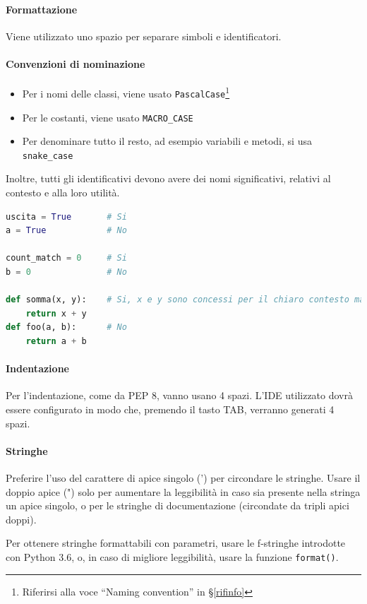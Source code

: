 		\paragraph{Formattazione}
		Viene utilizzato uno spazio per separare simboli e identificatori.
		


		\paragraph{Convenzioni di nominazione}
		\begin{itemize}
			\item Per i nomi delle classi, viene usato \texttt{PascalCase}\footnote{Riferirsi alla voce ``Naming convention'' in \S\ref{rifinfo}}
			\item Per le costanti, viene usato \texttt{MACRO\_CASE}
			\item Per denominare tutto il resto, ad esempio variabili e metodi, si usa \texttt{snake\_case}
		\end{itemize}

		Inoltre, tutti gli identificativi devono avere dei nomi significativi, relativi al contesto e alla loro utilità.
\begin{lstlisting}[language=Python]
uscita = True		# Si
a = True			# No

count_match = 0		# Si
b = 0				# No

def somma(x, y):	# Si, x e y sono concessi per il chiaro contesto matematico
	return x + y
def foo(a, b):		# No
	return a + b
\end{lstlisting}


        \paragraph{Indentazione}
		Per l'indentazione, come da PEP 8, vanno usano 4 spazi. L'IDE utilizzato dovrà essere configurato in modo che, premendo il
		tasto TAB, verranno generati 4 spazi.

		\paragraph{Stringhe}
		Preferire l'uso del carattere di apice singolo (') per circondare le stringhe. Usare il doppio apice (") solo per aumentare la
		leggibilità in caso sia presente nella stringa un apice singolo, o per le stringhe di documentazione (circondate da tripli apici doppi).\par
		Per ottenere stringhe formattabili con parametri, usare le f-stringhe introdotte con Python 3.6, o, in caso di migliore leggibilità, usare la funzione \texttt{format()}.

